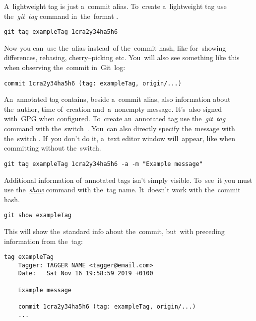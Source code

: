 A~lightweight tag is just a~commit alias. To~create a~lightweight tag use the~\textit{git~tag} command in~the~format .

\example
\begin{lstlisting}[frame=no]
    git tag exampleTag 1cra2y34ha5h6
\end{lstlisting}

\noindent Now you can~use the~alias  instead~of the~commit hash, like for~showing differences, rebasing, cherry--picking etc. You~will also see something like this when observing the~commit in~Git~log:
\begin{lstlisting}[frame=no]
    commit 1cra2y34ha5h6 (tag: exampleTag, origin/...)
\end{lstlisting}

\noindent An~annotated tag contains, beside a~commit alias, also information about the~author, time of~creation and~a~nonempty message. It's~also signed with~\hyperref[gpg]{GPG} when \hyperref[gitbasicconfiguration]{configured}. To~create an~annotated tag use the~\textit{git~tag} command with the~switch~. You~can also directly specify the~message with the~switch . If~you don't do it, a~text editor window will~appear, like when committing without the~switch.

\example
\begin{lstlisting}[frame=no]
    git tag exampleTag 1cra2y34ha5h6 -a -m "Example message"
\end{lstlisting}

\noindent Additional information of~annotated tags isn't simply visible. To~see~it you must use the~\hyperref[gitshow]{\textit{show}} command with the~tag name. It~doesn't work with the~commit hash.

\example
\begin{lstlisting}[frame=no]
    git show exampleTag
\end{lstlisting}

\noindent This will show the~standard info about the~commit, but~with preceding information from the~tag:
\begin{lstlisting}[frame=no]
    tag exampleTag
    Tagger: TAGGER NAME <tagger@email.com>
    Date:   Sat Nov 16 19:58:59 2019 +0100

    Example message

    commit 1cra2y34ha5h6 (tag: exampleTag, origin/...)
    ...
\end{lstlisting}

